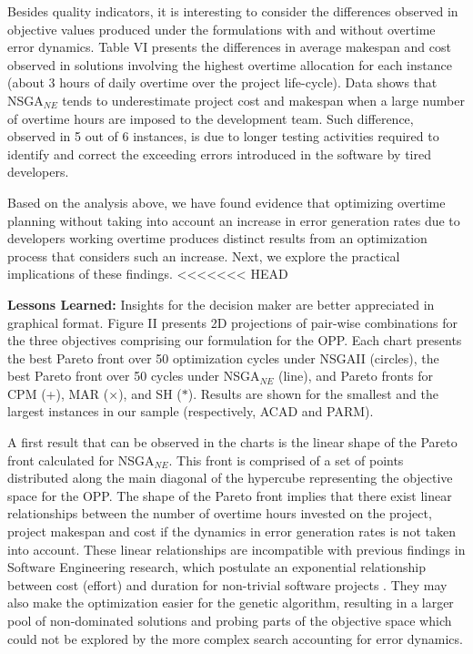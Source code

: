 \documentclass[conference]{IEEEtran}
\begin{document}
Besides quality indicators, it is interesting to consider the differences observed in objective values produced under the formulations with and without overtime error dynamics. Table VI presents the differences in average makespan and cost observed in solutions involving the highest overtime allocation for each instance (about 3 hours of daily overtime over the project life-cycle). Data shows that NSGA$_{NE}$ tends to underestimate project cost and makespan when a large number of overtime hours are imposed to the development team. Such difference, observed in 5 out of 6 instances, is due to longer testing activities required to identify and correct the exceeding errors introduced in the software by tired developers.

Based on the analysis above, we have found evidence that optimizing overtime planning without taking into account an increase in error generation rates due to developers working overtime produces distinct results from an optimization process that considers such an increase. Next, we explore the practical implications of these findings.
<<<<<<< HEAD

\noindent
\textbf{Lessons Learned:} Insights for the decision maker are better appreciated in graphical format. Figure II presents 2D projections of pair-wise combinations for the three objectives comprising our formulation for the OPP. Each chart presents the best Pareto front over 50 optimization cycles under NSGAII (circles), the best Pareto front over 50 cycles under NSGA$_{NE}$ (line), and Pareto fronts for CPM (+), MAR ($\times$), and SH ($\ast$). Results are shown for the smallest and the largest instances in our sample (respectively, ACAD and PARM).

A first result that can be observed in the charts is the linear shape of the Pareto front calculated for NSGA$_{NE}$. This front is comprised of a set of points distributed along the main diagonal of the hypercube representing the objective space for the OPP. The shape of the Pareto front implies that there exist linear relationships between the number of overtime hours invested on the project, project makespan and cost if the dynamics in error generation rates is not taken into account. These linear relationships are incompatible with previous findings in Software Engineering research, which postulate an exponential relationship between cost (effort) and duration for non-trivial software projects \cite{Boehm:1981}. They may also make the optimization easier for the genetic algorithm, resulting in a larger pool of non-dominated solutions and probing parts of the objective space which could not be explored by the more complex search accounting for error dynamics.
\end{document}
